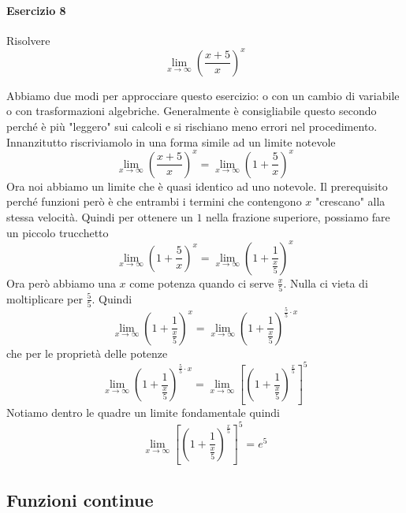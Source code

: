 \paragraph{Esercizio 8}
Risolvere
\begin{equation*}
  \lim\limits_{x\to\infty}\left(\frac{x+5}{x}\right)^x
\end{equation*}
\divisor

Abbiamo due modi per approcciare questo esercizio: o con un cambio di variabile o con trasformazioni
algebriche. Generalmente è consigliabile questo secondo perché è più "leggero" sui calcoli e si 
rischiano meno errori nel procedimento.\\
Innanzitutto riscriviamolo in una forma simile ad un limite notevole
\begin{equation*}
  \lim\limits_{x\to\infty}\left(\frac{x+5}{x}\right)^x = 
  \lim\limits_{x\to\infty}\left(1+\frac{5}{x}\right)^x
\end{equation*}
Ora noi abbiamo un limite che è quasi identico ad uno notevole. Il prerequisito perché funzioni però
è che entrambi i termini che contengono $x$ "crescano" alla stessa velocità. Quindi per ottenere
un $1$ nella frazione superiore, possiamo fare un piccolo trucchetto
\begin{equation*}
  \lim\limits_{x\to\infty}\left(1+\frac{5}{x}\right)^x=
  \lim\limits_{x\to\infty}\left(1+\frac{1}{\frac{x}{5}}\right)^x
\end{equation*}
Ora però abbiamo una $x$ come potenza quando ci serve $\frac{x}{5}$. Nulla ci vieta di moltiplicare
per $\frac{5}{5}$. Quindi
\begin{equation*}
  \lim\limits_{x\to\infty}\left(1+\frac{1}{\frac{x}{5}}\right)^x=
  \lim\limits_{x\to\infty}\left(1+\frac{1}{\frac{x}{5}}\right)^{\frac{5}{5}\cdot x}
\end{equation*}
che per le proprietà delle potenze
\begin{equation*}
  \lim\limits_{x\to\infty}\left(1+\frac{1}{\frac{x}{5}}\right)^{\frac{5}{5}\cdot x}=
  \lim\limits_{x\to\infty}\left[\left(1+\frac{1}{\frac{x}{5}}\right)^\frac{x}{5}\right]^5
\end{equation*}
Notiamo dentro le quadre un limite fondamentale quindi
\begin{equation*}
  \lim\limits_{x\to\infty}\left[\left(1+\frac{1}{\frac{x}{5}}\right)^\frac{x}{5}\right]^5=\boxed{e^5}
\end{equation*}

\subsection*{Funzioni continue}
\label{ex:funzCont}

